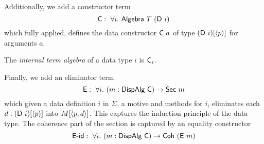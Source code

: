 Additionally, we add a constructor term
\[
	\mta{C} :\ \forall i.\ \mta{Algebra}\ T\ (\mta{D}\ i)
\]
which fully applied, defines the data constructor $\textsf{C}\ a$ of type
$(\textsf{D}\ i)[\langle p\rangle]$ for arguments $a$.

\begin{definition}
	The \emph{internal term algebra} of a data type $i$ is $\textsf{C}_i$.
\end{definition}


Finally, we add an eliminator term
\[
	\mta{E} :\ \forall i.\ (m : \mta{DispAlg}\ \mta{C}) \to \mta{Sec}\ m
\]
which given a data definition $i$ in $\Sigma$, a motive and methods for $i$,
eliminates each $d : (\textsf{D}\ i)[\langle p\rangle]$ into $M[\langle p;d\rangle]$. This captures
the induction principle of the data type. The coherence part of the section is
captured by an equality constructor
\[
	\mta{E-id} :\ \forall i.\ (m : \mta{DispAlg}\ \mta{C}) \to \mta{Coh}\ (\mta{E}\ m)
\]

